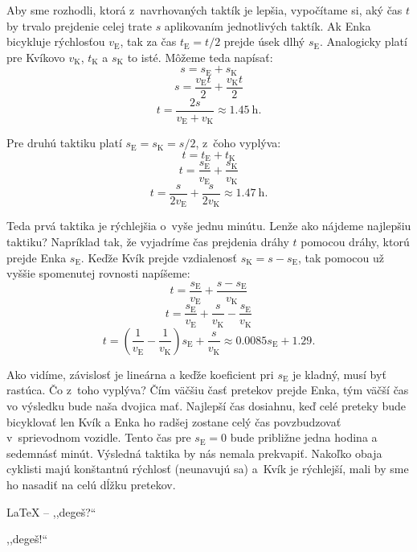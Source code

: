 Aby sme rozhodli, ktorá z~navrhovaných taktík je lepšia, vypočítame si, aký čas $t$ by trvalo prejdenie celej trate $s$ aplikovaním jednotlivých taktík.
Ak Enka bicykluje rýchlosťou $v_{\mathrm{E}}$, tak za čas $t_{\mathrm{E}} = t/2$ prejde úsek dlhý $s_{\mathrm{E}}$.
Analogicky platí pre Kvíkovo $v_{\mathrm{K}}$, $t_{\mathrm{K}}$ a $s_{\mathrm{K}}$ to isté. Môžeme teda napísať:
$$s=s_{\mathrm{E}} + s_{\mathrm{K}}$$
$$s=\frac{v_{\mathrm{E}} t}{2} + \frac{v_{\mathrm{K}} t}{2}$$
$$t=\frac{2s}{v_{\mathrm{E}} + v_{\mathrm{K}}} \approx \SI{1.45}{\hour} \text{.}$$

Pre druhú taktiku platí $s_{\mathrm{E}}=s_{\mathrm{K}}= s/2$, z~čoho vyplýva:
$$t=t_{\mathrm{E}}+t_{\mathrm{K}}$$
$$t=\frac{s_{\mathrm{E}}}{v_{\mathrm{E}}}+\frac{s_{\mathrm{K}}}{v_{\mathrm{K}}}$$
$$t=\frac{s}{2v_{\mathrm{E}}}+\frac{s}{2v_{\mathrm{K}}}  \approx \SI{1.47}{\hour} \text{.}$$

Teda prvá taktika je rýchlejšia o~vyše jednu minútu.
Lenže ako nájdeme najlepšiu taktiku? Napríklad tak, že vyjadríme čas prejdenia dráhy $t$ pomocou dráhy, ktorú prejde Enka $s_{\mathrm{E}}$.
Keďže Kvík prejde vzdialenosť $s_{\mathrm{K}}=s - s_{\mathrm{E}}$, tak pomocou už vyššie spomenutej rovnosti napíšeme:
$$t=\frac{s_{\mathrm{E}}}{v_{\mathrm{E}}}+\frac{s - s_{\mathrm{E}}}{v_{\mathrm{K}}}$$
$$t=\frac{s_{\mathrm{E}}}{v_{\mathrm{E}}}+\frac{s}{v_{\mathrm{K}}}-\frac{s_{\mathrm{E}}}{v_{\mathrm{K}}}$$
$$t=\left(\frac{1}{v_{\mathrm{E}}}-\frac{1}{v_{\mathrm{K}}}\right)s_{\mathrm{E}}+\frac{s}{v_{\mathrm{K}}} \approx 0.0085s_{\mathrm{E}}+1.29  \text{.}$$

Ako vidíme, závislosť je lineárna a keďže koeficient pri $s_{\mathrm{E}}$ je kladný, musí byť rastúca.
Čo z~toho vyplýva? Čím väčšiu časť pretekov prejde Enka, tým väčší čas vo výsledku bude naša dvojica mať.
Najlepší čas dosiahnu, keď celé preteky bude bicyklovať len Kvík a Enka ho radšej zostane celý čas povzbudzovať v~sprievodnom vozidle.
Tento čas pre $s_{\mathrm{E}}=0$ bude približne jedna hodina a sedemnásť minút.
Výsledná taktika by nás nemala prekvapiť. Nakoľko obaja cyklisti majú konštantnú rýchlosť (neunavujú sa) a~Kvík je rýchlejší, mali by sme ho nasadiť na celú dĺžku pretekov.

\LaTeX{} -- ,,degeš?``


,,degeš!``

